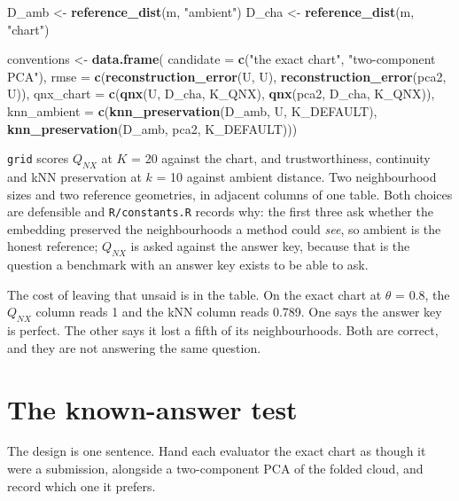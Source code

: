 \documentclass[
  british,
  a4paper,
]{book}
\newenvironment{Shaded}{\begin{snugshade}}{\end{snugshade}}
\newcommand{\AttributeTok}[1]{\textcolor[rgb]{0.13,0.29,0.53}{#1}}
\newcommand{\FunctionTok}[1]{\textcolor[rgb]{0.13,0.29,0.53}{\textbf{#1}}}
\newcommand{\NormalTok}[1]{#1}
\newcommand{\OtherTok}[1]{\textcolor[rgb]{0.56,0.35,0.01}{#1}}
\newcommand{\StringTok}[1]{\textcolor[rgb]{0.31,0.60,0.02}{#1}}
\begin{document}
\begin{Shaded}
\begin{Highlighting}[]
\NormalTok{D\_amb }\OtherTok{\textless{}{-}} \FunctionTok{reference\_dist}\NormalTok{(m, }\StringTok{"ambient"}\NormalTok{)}
\NormalTok{D\_cha }\OtherTok{\textless{}{-}} \FunctionTok{reference\_dist}\NormalTok{(m, }\StringTok{"chart"}\NormalTok{)}

\NormalTok{conventions }\OtherTok{\textless{}{-}} \FunctionTok{data.frame}\NormalTok{(}
  \AttributeTok{candidate  =} \FunctionTok{c}\NormalTok{(}\StringTok{"the exact chart"}\NormalTok{, }\StringTok{"two{-}component PCA"}\NormalTok{),}
  \AttributeTok{rmse       =} \FunctionTok{c}\NormalTok{(}\FunctionTok{reconstruction\_error}\NormalTok{(U, U), }\FunctionTok{reconstruction\_error}\NormalTok{(pca2, U)),}
  \AttributeTok{qnx\_chart  =} \FunctionTok{c}\NormalTok{(}\FunctionTok{qnx}\NormalTok{(U, D\_cha, K\_QNX), }\FunctionTok{qnx}\NormalTok{(pca2, D\_cha, K\_QNX)),}
  \AttributeTok{knn\_ambient =} \FunctionTok{c}\NormalTok{(}\FunctionTok{knn\_preservation}\NormalTok{(D\_amb, U,    K\_DEFAULT),}
                  \FunctionTok{knn\_preservation}\NormalTok{(D\_amb, pca2, K\_DEFAULT)))}
\end{Highlighting}
\end{Shaded}

\texttt{grid} scores \(Q_{NX}\) at \(K\) = 20 against the
chart, and trustworthiness, continuity and kNN preservation
at \(k\) = 10 against ambient distance. Two
neighbourhood sizes and two reference geometries, in adjacent columns of one
table. Both choices are defensible and \texttt{R/constants.R} records why: the first
three ask whether the embedding preserved the neighbourhoods a method could
\emph{see}, so ambient is the honest reference; \(Q_{NX}\) is asked against the answer
key, because that is the question a benchmark with an answer key exists to be
able to ask.

The cost of leaving that unsaid is in the table. On the exact chart at
\(\theta\) = 0.8, the \(Q_{NX}\) column reads
1 and the kNN column reads
0.789. One says the answer key is perfect.
The other says it lost a fifth of its neighbourhoods. Both are correct, and
they are not answering the same question.

\section{The known-answer test}\label{eval-core}

The design is one sentence. Hand each evaluator the exact chart as though it
were a submission, alongside a two-component PCA of the folded cloud, and record
which one it prefers.
\end{document}
